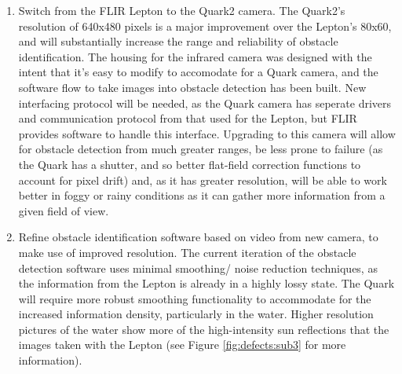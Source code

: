 \begin{enumerate}
  \item Switch from the FLIR Lepton to the Quark2 camera.  The Quark2's resolution of 640x480 pixels is a major improvement over the Lepton's 80x60, and will substantially increase the range and reliability of obstacle identification. The housing for the infrared camera was designed with the intent that it's easy to modify to accomodate for a Quark camera, and the software flow to take images into obstacle detection has been built. New interfacing protocol will be needed, as the Quark camera has seperate drivers and communication protocol from that used for the Lepton, but FLIR provides software to handle this interface. Upgrading to this camera will allow for obstacle detection from much greater ranges, be less prone to failure (as the Quark has a shutter, and so better flat-field correction functions to account for pixel drift) and, as it has greater resolution, will be able to work better in foggy or rainy conditions as it can gather more information from a given field of view.
  \item Refine obstacle identification software based on video from new camera, to make use of improved resolution. The current iteration of the obstacle detection software uses minimal smoothing/ noise reduction techniques, as the information from the Lepton is already in a highly lossy state. The Quark will require more robust smoothing functionality to accommodate for the increased information density, particularly in the water. Higher resolution pictures of the water show more of the high-intensity sun reflections that the images taken with the Lepton (see Figure \ref{fig:defects:sub3} for more information).
\end{enumerate}
